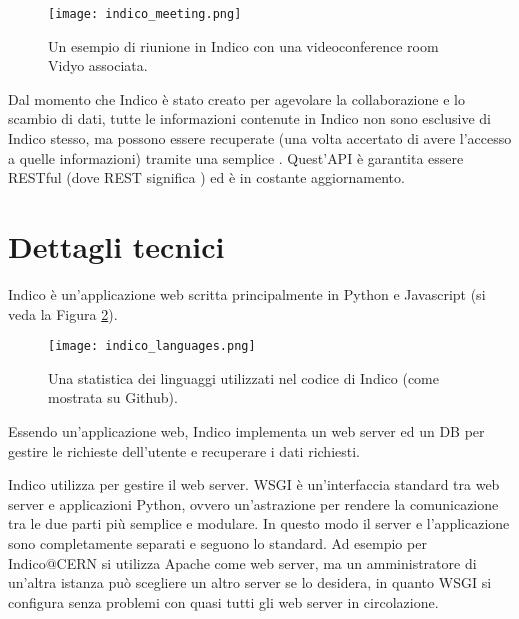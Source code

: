		\begin{figure}[h!]
			\begin{center}
				\texttt{[image: indico\_meeting.png]}
			\end{center}
			\caption[Meeting in Indico (esempio)]{Un esempio di riunione in Indico con una videoconference room Vidyo associata.}
			\label{fig:indico_meeting}
		\end{figure}
		
		Dal momento che Indico è stato creato per agevolare la collaborazione e lo scambio di dati, tutte le informazioni contenute in Indico non sono esclusive di Indico stesso, ma possono essere recuperate (una volta accertato di avere l'accesso a quelle informazioni) tramite una semplice . Quest'\ac{API} è garantita essere RESTful  (dove \acs{REST} significa ) ed è in costante aggiornamento.
		
	\section{Dettagli tecnici} \label{sec:i;dettagli_tecnici}
	
		Indico è un'applicazione web scritta principalmente in Python e Javascript (si veda la Figura \ref{fig:indico_languages}).
		
		\begin{figure}[h!]
			\begin{center}
				\texttt{[image: indico\_languages.png]}
			\end{center}
			\caption[Linguaggi di Indico]{Una statistica dei linguaggi utilizzati nel codice di Indico (come mostrata su Github).}
			\label{fig:indico_languages}
		\end{figure}
		
		Essendo un'applicazione web, Indico implementa un web server ed un \ac{DB} per gestire le richieste dell'utente e recuperare i dati richiesti.
		
		Indico utilizza  per gestire il web server. \ac{WSGI} è un'interfaccia standard tra web server e applicazioni Python, ovvero un'astrazione per rendere la comunicazione tra le due parti più semplice e modulare. In questo modo il server e  l'applicazione sono completamente separati e seguono lo standard. Ad esempio per Indico@CERN si utilizza Apache come web server, ma un amministratore di un'altra istanza può scegliere un altro server se lo desidera, in quanto \ac{WSGI} si configura senza problemi con quasi tutti gli web server in circolazione. \cite{indico:wsgi}
		
